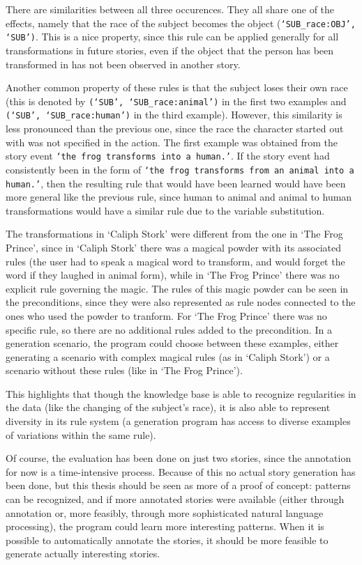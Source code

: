 There are similarities between all three occurences. They all share one of the
effects, namely that the race of the subject becomes the object
(\texttt{`SUB\_race:OBJ', `SUB')}.
This is a nice property, since this rule can be applied generally for all
transformations in future stories, even if the object that the person has been
transformed in has not been observed in another story.

Another common property of these rules is that the subject loses their own race
(this is denoted by \texttt{(`SUB', `SUB\_race:animal')} in the first two examples and 
\texttt{(`SUB', `SUB\_race:human')} in the third example). However, this similarity is
less pronounced than the previous one, since the race the character started out
with was not specified in the action. The first example was obtained from the
story event \texttt{`the frog transforms into a human.'}. If the story event had
consistently been in the form of \texttt{`the
frog transforms from an animal into a human.'}, then the resulting rule that
would have been learned would have been more general like the previous rule, 
since human to animal
and animal to human transformations would have a similar rule due to the
variable substitution.

The transformations in `Caliph Stork' were different from the one in `The Frog
Prince', since in `Caliph Stork' there was a magical powder with its associated
rules (the user had to speak a magical word to transform, and would forget the
word if they laughed in animal form), while in `The Frog Prince' there was no
explicit rule governing the magic. The rules of this magic powder can be seen in
the preconditions, since they were also represented as rule nodes connected to
the ones who used the powder to tranform. For `The Frog Prince' there was no
specific rule, so there are no additional rules added to the precondition. In a
generation scenario, the program could choose between these examples, either
generating a scenario with complex magical rules (as in `Caliph Stork') or a 
scenario without these rules (like in `The Frog Prince'). 

This highlights that
though the knowledge base is able to recognize regularities in the data (like
the changing of the subject's race), it is also able to represent diversity in
its rule system (a generation program has access to diverse examples of
variations within the same rule).

Of course, the evaluation has been done on just two stories, since the
annotation for now is a time-intensive process. Because of this no actual story
generation has been done, but this thesis should be seen as more of a proof of
concept: patterns can be recognized, and if more annotated stories were
available (either through annotation or, more feasibly, through more
sophisticated natural language processing), the program could learn more interesting patterns. When it is
possible to automatically annotate the stories, it should be more feasible to
generate actually interesting stories.
